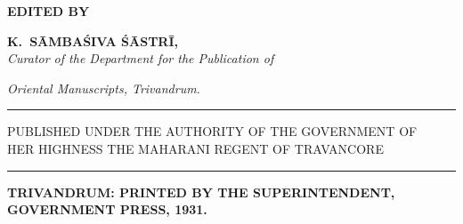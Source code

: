 \documentclass[11pt, openany]{book}
\begin{document}
\begin{center}
\vspace{0.2cm}

{\footnotesize\textbf{\en EDITED BY}}

\vspace{0.3cm} \textbf{\en K.~SĀMBAŚIVA ŚĀSTRĪ,}\\
\vspace{0.2cm}
\small\emph{\en Curator of the Department for the Publication of}

\emph{\en Oriental Manuscripts, Trivandrum.}

\rule{2cm}{.5mm} 

{\en PUBLISHED UNDER THE AUTHORITY OF THE GOVERNMENT OF \\HER HIGHNESS THE MAHARANI REGENT OF TRAVANCORE}

\rule{2cm}{.5mm} 

\vspace{0.3cm}\scriptsize{\textbf{\en TRIVANDRUM: PRINTED BY THE SUPERINTENDENT, GOVERNMENT PRESS, 1931.}}
\end{center}

\newpage
\end{document}
